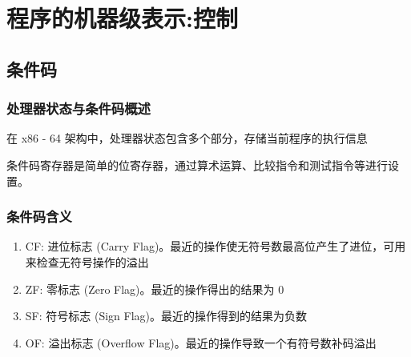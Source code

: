 \section{程序的机器级表示:控制}
\subsection{条件码}
\subsubsection{处理器状态与条件码概述}
在 x86 - 64 架构中，处理器状态包含多个部分，存储当前程序的执行信息
条件码寄存器是简单的位寄存器，通过算术运算、比较指令和测试指令等进行设置。

\subsubsection{条件码含义}
\begin{enumerate}
    \item CF: 进位标志 (Carry Flag)。最近的操作使无符号数最高位产生了进位，可用来检查无符号操作的溢出
    \item ZF: 零标志 (Zero Flag)。最近的操作得出的结果为 0
    \item SF: 符号标志 (Sign Flag)。最近的操作得到的结果为负数
    \item OF: 溢出标志 (Overflow Flag)。最近的操作导致一个有符号数补码溢出
\end{enumerate}


